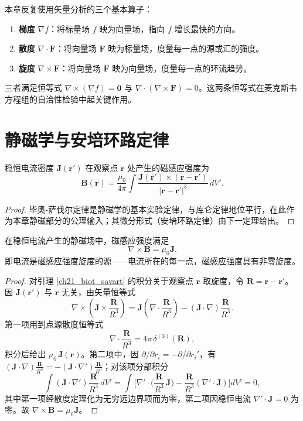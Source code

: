 \begin{remark}[三个矢量微分算子]\label{rem:three_operators}
本章反复使用矢量分析的三个基本算子：
\begin{enumerate}[label=(\roman*)]
    \item \textbf{梯度} $\nabla f$：将标量场 $f$ 映为向量场，指向 $f$ 增长最快的方向。
    \item \textbf{散度} $\nabla \cdot \mathbf{F}$：将向量场 $\mathbf{F}$ 映为标量场，度量每一点的源或汇的强度。
    \item \textbf{旋度} $\nabla \times \mathbf{F}$：将向量场 $\mathbf{F}$ 映为向量场，度量每一点的环流趋势。
\end{enumerate}
三者满足恒等式 $\nabla \times (\nabla f) = \mathbf{0}$ 与 $\nabla \cdot (\nabla \times \mathbf{F}) = 0$。这两条恒等式在麦克斯韦方程组的自洽性检验中起关键作用。
\end{remark}

\section{静磁学与安培环路定律}

\begin{lemma}[毕奥-萨伐尔定律]\label{ch21_biot_savart}
稳恒电流密度 $\mathbf{J}(\mathbf{r}')$ 在观察点 $\mathbf{r}$ 处产生的磁感应强度为
\[
\mathbf{B}(\mathbf{r}) = \frac{\mu_0}{4\pi} \int \frac{\mathbf{J}(\mathbf{r}') \times (\mathbf{r}-\mathbf{r}')}{|\mathbf{r}-\mathbf{r}'|^3}\, dV'.
\]
\end{lemma}

\begin{proof}
毕奥-萨伐尔定律是静磁学的基本实验定律，与库仑定律地位平行，在此作为本章静磁部分的公理输入；其微分形式（安培环路定律）由下一定理给出。
\end{proof}

\begin{theorem}[安培环路定律]\label{thm:ampere_law}
在稳恒电流产生的静磁场中，磁感应强度满足
\[
\boxed{\nabla \times \mathbf{B} = \mu_0 \mathbf{J}}.
\]
即电流是磁感应强度旋度的源——电流所在的每一点，磁感应强度具有非零旋度。
\end{theorem}

\begin{proof}
对引理 \ref{ch21_biot_savart} 的积分关于观察点 $\mathbf{r}$ 取旋度，令 $\mathbf{R}=\mathbf{r}-\mathbf{r}'$。因 $\mathbf{J}(\mathbf{r}')$ 与 $\mathbf{r}$ 无关，由矢量恒等式
\[
\nabla\times\left(\mathbf{J}\times\frac{\mathbf{R}}{R^3}\right)
= \mathbf{J}\left(\nabla\cdot\frac{\mathbf{R}}{R^3}\right)
- (\mathbf{J}\cdot\nabla)\frac{\mathbf{R}}{R^3}.
\]
第一项用到点源散度恒等式
\[
\nabla\cdot\frac{\mathbf{R}}{R^3} = 4\pi\,\delta^{(3)}(\mathbf{R}),
\]
积分后给出 $\mu_0\,\mathbf{J}(\mathbf{r})$。第二项中，因 $\partial/\partial r_i = -\partial/\partial r_i'$，有 $(\mathbf{J}\cdot\nabla)\frac{\mathbf{R}}{R^3} = -(\mathbf{J}\cdot\nabla')\frac{\mathbf{R}}{R^3}$；对该项分部积分
\[
\int (\mathbf{J}\cdot\nabla')\frac{\mathbf{R}}{R^3}\,dV'
= \int\Big[\nabla'\cdot\Big(\frac{\mathbf{R}}{R^3}\,\mathbf{J}\Big) - \frac{\mathbf{R}}{R^3}(\nabla'\cdot\mathbf{J})\Big]dV'
= 0,
\]
其中第一项经散度定理化为无穷远边界项而为零，第二项因稳恒电流 $\nabla'\cdot\mathbf{J}=0$ 为零。故 $\nabla\times\mathbf{B} = \mu_0\mathbf{J}$。
\end{proof}

